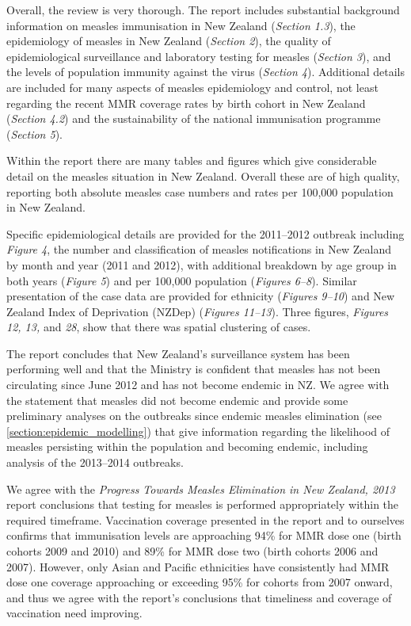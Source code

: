 \documentclass{article}
\begin{document}
Overall, the review is very thorough. The report includes substantial background information on measles immunisation in New Zealand (\emph{Section 1.3}), the epidemiology of measles in New Zealand (\emph{Section 2}), the quality of epidemiological surveillance and laboratory testing for measles (\emph{Section 3}), and the levels of population immunity against the virus (\emph{Section 4}). Additional details are included for many aspects of measles epidemiology and control, not least regarding the recent MMR coverage rates by birth cohort in New Zealand (\emph{Section 4.2}) and the sustainability of the national immunisation programme (\emph{Section 5}).

Within the report there are many tables and figures which give considerable detail on the measles situation in New Zealand. Overall these are of high quality, reporting both absolute measles case numbers and rates per 100,000 population in New Zealand.

Specific epidemiological details are provided for the 2011--2012 outbreak including \emph{Figure 4}, the number and classification of measles notifications in New Zealand by month and year (2011 and 2012), with additional breakdown by age group in both years (\emph{Figure 5}) and per 100,000 population (\emph{Figures 6--8}). Similar presentation of the case data are provided for ethnicity (\emph{Figures 9--10}) and New Zealand Index of Deprivation (NZDep) (\emph{Figures 11--13}). Three figures, \emph{Figures 12, 13,} and \emph{28}, show that there was spatial clustering of cases.

The report concludes that New Zealand's surveillance system has been performing well and that the Ministry is confident that measles has not been circulating since June 2012 and has not become endemic in NZ. We agree with the statement that measles did not become endemic and provide some preliminary analyses on the outbreaks since endemic measles elimination (see \autoref{section:epidemic_modelling}) that give information regarding the likelihood of measles persisting within the population and becoming endemic, including analysis of the 2013--2014 outbreaks.

We agree with the \emph {Progress Towards Measles Elimination in New Zealand, 2013} report conclusions that testing for measles is performed appropriately within the required timeframe. Vaccination coverage presented in the report and to ourselves confirms that immunisation levels are approaching 94\% for MMR dose one (birth cohorts 2009 and 2010) and 89\% for MMR dose two (birth cohorts 2006 and 2007). However, only Asian and Pacific ethnicities have consistently had MMR dose one coverage approaching or exceeding 95\% for cohorts from 2007 onward, and thus we agree with the report's conclusions that timeliness and coverage of vaccination need improving.
\end{document}
